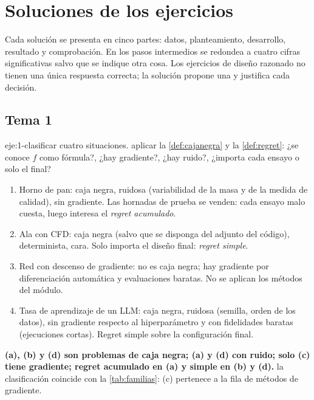 \chapter{Soluciones de los ejercicios}
\label{ap:soluciones}

Cada solución se presenta en cinco partes: datos, planteamiento, desarrollo, resultado y comprobación. En los pasos intermedios se redondea a cuatro cifras significativas salvo que se indique otra cosa. Los ejercicios de diseño razonado no tienen una única respuesta correcta; la solución propone una y justifica cada decisión.

\section{Tema 1}

\begin{solucion}{eje:1-clasificar}
\datos cuatro situaciones.
\planteamiento aplicar la \cref{def:cajanegra} y la \cref{def:regret}: ¿se conoce $f$ como fórmula?, ¿hay gradiente?, ¿hay ruido?, ¿importa cada ensayo o solo el final?
\pasos
\begin{enumerate}[label=(\alph*)]
  \item Horno de pan: caja negra, ruidosa (variabilidad de la masa y de la medida de calidad), sin gradiente. Las hornadas de prueba se venden: cada ensayo malo cuesta, luego interesa el \emph{regret acumulado}.
  \item Ala con CFD: caja negra (salvo que se disponga del adjunto del código), determinista, cara. Solo importa el diseño final: \emph{regret simple}.
  \item Red con descenso de gradiente: no es caja negra; hay gradiente por diferenciación automática y evaluaciones baratas. No se aplican los métodos del módulo.
  \item Tasa de aprendizaje de un LLM: caja negra, ruidosa (semilla, orden de los datos), sin gradiente respecto al hiperparámetro y con fidelidades baratas (ejecuciones cortas). Regret simple sobre la configuración final.
\end{enumerate}
\resultado \textbf{(a), (b) y (d) son problemas de caja negra; (a) y (d) con ruido; solo (c) tiene gradiente; regret acumulado en (a) y simple en (b) y (d).}
\comprobacion la clasificación coincide con la \cref{tab:familias}: (c) pertenece a la fila de métodos de gradiente.
\end{solucion}

